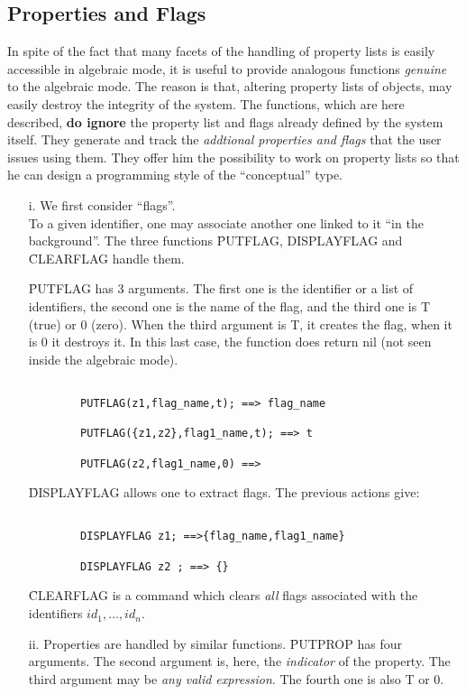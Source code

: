 \subsection{Properties and Flags}
In spite of the fact that many facets of the handling of
property lists is easily accessible in algebraic mode, it is useful to
provide analogous functions {\em genuine} to the algebraic mode. The reason is
that, altering property lists of objects, may easily destroy the integrity
of the system. The functions, which are here described, {\bf do ignore}
the property list and flags already defined by the system itself. They
generate and track the {\em addtional properties and flags} that the user
issues using them. They offer him
the  possibility to work on property lists so
that he can design a programming style of the ``conceptual'' type.
\begin{itemize}
\item[i.] We first consider ``flags''. \\
To a given identifier, one may
associate another one linked to it ``in the background''. The  three
functions \f{PUTFLAG, DISPLAYFLAG} and \f{CLEARFLAG} handle them.

\f{PUTFLAG} has 3 arguments. The first one is the identifier or a list
of identifiers, the second one is the name of the flag,
and the third one is T (true) or 0 (zero).
When the third argument is T, it creates the flag, when it is 0 it
destroys it. In this last case, the function does return nil (not seen 
inside the algebraic mode).
\begin{verbatim}

        PUTFLAG(z1,flag_name,t); ==> flag_name

        PUTFLAG({z1,z2},flag1_name,t); ==> t

        PUTFLAG(z2,flag1_name,0) ==>

\end{verbatim}
\f{DISPLAYFLAG} allows one to extract flags. The previous actions give:
\begin{verbatim}

        DISPLAYFLAG z1; ==>{flag_name,flag1_name}

        DISPLAYFLAG z2 ; ==> {}

\end{verbatim}
\f{CLEARFLAG} is a command which clears {\em all} flags associated with
the identifiers $id_1, \ldots , id_n .$
\item[ii.] Properties are handled by similar functions.
\f{PUTPROP} has four arguments. The second argument is, here, the
{\em indicator} of the property. The third argument may be {\em any
valid expression}. The fourth one is also T or 0.
\begin{verbatim}


\end{verbatim}
\end{itemize}
